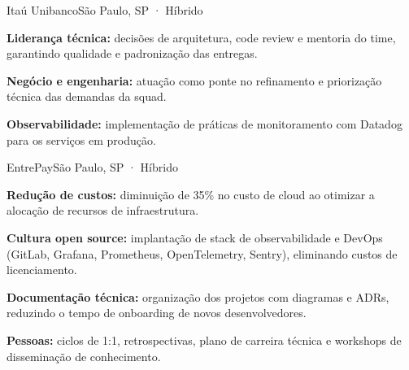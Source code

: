 \documentclass{resume}
\begin{document}
        {Itaú Unibanco}{São Paulo, SP · Híbrido}
\begin{cvitems}
  \item \textbf{Liderança técnica:} decisões de arquitetura, code review e mentoria do
        time, garantindo qualidade e padronização das entregas.
  \item \textbf{Negócio e engenharia:} atuação como ponte no refinamento e priorização
        técnica das demandas da squad.
  \item \textbf{Observabilidade:} implementação de práticas de monitoramento com Datadog
        para os serviços em produção.
\end{cvitems}

        {EntrePay}{São Paulo, SP · Híbrido}
\begin{cvitems}
  \item \textbf{Redução de custos:} diminuição de 35\% no custo de cloud ao otimizar a
        alocação de recursos de infraestrutura.
  \item \textbf{Cultura open source:} implantação de stack de observabilidade e DevOps
        (GitLab, Grafana, Prometheus, OpenTelemetry, Sentry), eliminando custos de licenciamento.
  \item \textbf{Documentação técnica:} organização dos projetos com diagramas e ADRs,
        reduzindo o tempo de onboarding de novos desenvolvedores.
  \item \textbf{Pessoas:} ciclos de 1:1, retrospectivas, plano de carreira técnica e
        workshops de disseminação de conhecimento.
\end{cvitems}
\end{document}
